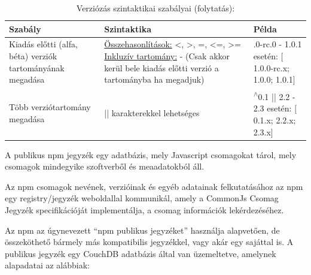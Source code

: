 	\begin{table}[h]
		\caption{Verziózás szintaktikai szabályai (folytatás):}
		\label{tab:sem-ver-pt2}
		\begin{tabularx}{\textwidth} { 
				| >{\centering\arraybackslash}X 
				| >{\centering\arraybackslash}X 
				| >{\centering\arraybackslash}X | }
			\hline
			\textbf{Szabály} & \textbf{Szintaktika} & \textbf{Példa} \\
			\hline 
			Kiadás előtti (alfa, béta) verziók tartományának megadása & \underline{Összehasonlítások:} <, >, =, <=, >= \underline{Inkluzív tartomány:} - (Csak akkor kerül bele kiadás előtti verzió a tartományba ha megadjuk) & 1.0.0-rc.0 - 1.0.1 esetén: $\big[$1.0.0-rc.x; 1.0.0; 1.0.1$\big]$ \\
			\hline
			Több verziótartomány megadása & || karakterekkel lehetséges & \textsuperscript{$\wedge$}0.1 ||  2.2 - 2.3 esetén: $\big[$0.1.x; 2.2.x; 2.3.x$\big]$\\
			\hline
		\end{tabularx}
	\end{table}
	\begin{flushright}
		\cite{npm-versioning} \cite{npm-versioning-semver}
	\end{flushright}


A publikus npm jegyzék egy adatbázis, mely Javascript csomagokat tárol, mely csomagok mindegyike szoftverből és meaadatokból áll.

Az npm csomagok nevének, verzióinak és egyéb adatainak felkutatásához az npm egy registry/jegyzék weboldallal kommunikál, amely a CommonJs Csomag Jegyzék specifikációját implementálja, a csomag információk lekérdezéséhez.
 
Az npm az úgynevezett “npm publikus jegyzéket” használja alapvetően, de összeköthető bármely más kompatibilis jegyzékkel, vagy akár egy sajáttal is. A publikus jegyzék egy CouchDB adatbázis által van üzemeltetve, amelynek alapadatai az alábbiak:\\

